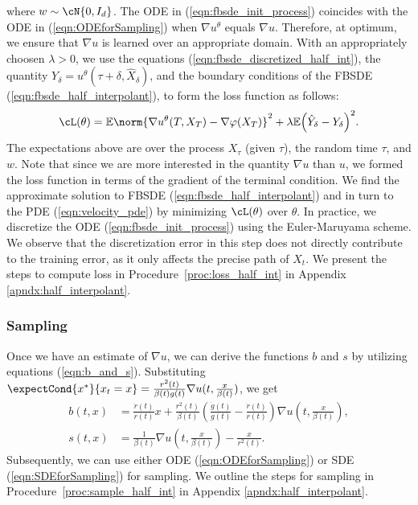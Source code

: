 where $w\sim\cN{0,I_d}$. 
The ODE in (\ref{eqn:fbsde_init_process}) coincides with the ODE in (\ref{eqn:ODEforSampling}) when $\nabla u^\theta$ equals $\nabla u$. Therefore, at optimum, we ensure that $\nabla u$ is learned over an appropriate domain. With an appropriately choosen $\lambda>0$, we use the equations (\ref{eqn:fbsde_discretized_half_int}), the quantity $Y_\delta = u^\theta(\tau+\delta,\hat{X}_\delta)$, and the boundary conditions of the FBSDE (\ref{eqn:fbsde_half_interpolant}), to form the loss function as follows:
\begin{equation}\label{lossFBSDElocal}
\cL(\theta) = \mathbb{E}{ \norm{\nabla u^\theta(T,X_{T})-\nabla\varphi(X_T)}^2}+\lambda\mathbb{E}{\left(\hat{Y}_{\delta}-Y_{\delta}\right)^2}. %
\end{equation}
The expectations above are over the process $X_\tau$ (given $\tau$), the random time $\tau$, and $w$. Note that since we are more interested in the quantity $\nabla u$ than $u$, we formed the loss function in terms of the gradient of the terminal condition.  We find the approximate solution to FBSDE (\ref{eqn:fbsde_half_interpolant}) and in turn to the PDE (\ref{eqn:velocity_pde}) by minimizing $\cL(\theta)$ over $\theta$. In practice, we discretize the ODE (\ref{eqn:fbsde_init_process}) using the Euler-Maruyama scheme. We observe that the discretization error in this step does not directly contribute to the training error, as it only affects the precise path of $X_t$. We present the steps to compute loss in Procedure~\ref{proc:loss_half_int} in Appendix \ref{apndx:half_interpolant}.

\subsubsection{Sampling}
Once we have an estimate of $\nabla u$, we can derive the functions $b$ and $s$ by utilizing equations (\ref{eqn:b_and_s}). Substituting $\expectCond{x^*}{x_t=x}=\frac{r^2(t)}{\beta(t)g(t)}\nabla u(t,\frac{x}{\beta(t)})$, we get
\begin{align*}
    b(t,x) &= \frac{\dot r(t)}{r(t)}x+\frac{r^2(t)}{\beta(t)}\left(\frac{\dot g(t)}{g(t)}-\frac{\dot r(t)}{r(t)}\right)\nabla u\left(t,\frac{x}{\beta(t)}\right),\\
    s(t,x) &= \frac{1}{\beta(t)}\nabla u\left(t,\frac{x}{\beta(t)}\right) -\frac{x}{r^2(t)}.
\end{align*}
Subsequently, we can use either ODE (\ref{eqn:ODEforSampling}) or SDE (\ref{eqn:SDEforSampling}) for sampling. We outline the steps for sampling in Procedure~\ref{proc:sample_half_int} in Appendix \ref{apndx:half_interpolant}.

